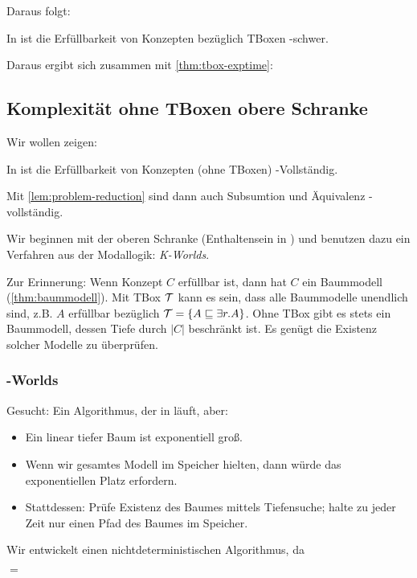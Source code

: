 Daraus folgt:
\begin{theorem}
In \ALC ist die Erfüllbarkeit von Konzepten bezüglich TBoxen \ExpTime-schwer.
\end{theorem}

Daraus ergibt sich zusammen mit \autoref{thm:tbox-exptime}:

\subsection{Komplexität ohne TBoxen obere
Schranke}\label{komplexituxe4t-ohne-tboxen-obere-schranke}

Wir wollen zeigen:

\begin{theorem}
In \ALC ist die Erfüllbarkeit von Konzepten (ohne TBoxen)
\PSpace-Vollständig.
\end{theorem}
Mit \autoref{lem:problem-reduction} sind dann auch Subsumtion und Äquivalenz \PSpace-vollständig.

Wir beginnen mit der oberen Schranke (Enthaltensein in \PSpace) und benutzen dazu ein Verfahren aus der Modallogik: \emph{K-Worlds}.

Zur Erinnerung: Wenn Konzept $C$ erfüllbar ist, dann hat $C$ ein Baummodell (\autoref{thm:baummodell}). Mit TBox $\mathcal{T}$ kann es sein, dass alle Baummodelle unendlich sind, z.B. $A$ erfüllbar bezüglich $\mathcal{T} = \{A \sqsubseteq \exists r.A\}$. Ohne TBox gibt es stets ein Baummodell, dessen Tiefe durch $|C|$ beschränkt ist. Es genügt die Existenz solcher Modelle zu überprüfen.

\subsubsection{\texorpdfstring{\ALC}{ALC}-Worlds}\label{alc-worlds}

Gesucht: Ein Algorithmus, der in \PSpace{} läuft, aber:
\begin{itemize}
\item Ein linear tiefer Baum ist exponentiell groß.
\item Wenn wir gesamtes Modell im Speicher hielten, dann würde das exponentiellen Platz erfordern.
\item Stattdessen: Prüfe Existenz des Baumes mittels Tiefensuche; halte zu
  jeder Zeit nur einen Pfad des Baumes im Speicher.
\end{itemize}

Wir entwickelt einen nichtdeterministischen Algorithmus, da
\begin{theorem}[Savitch 1970]
    \PSpace{} $=$ \NPSpace{}
\end{theorem}

